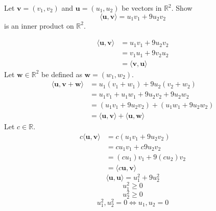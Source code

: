 \begin{exercise}
    Let \(\mathbf{v} =\left( v_1,v_2 \right) \) and \(\mathbf{u} =\left( u_1,u_2 \right) \) be vectors in \(\mathbb{R} ^2\). Show 
    \[
        \langle \mathbf{u} ,\mathbf{v}  \rangle =u_1 v_1 +9u_2 v_2
    \]
    is an inner product on \(\mathbb{R} ^2\).
    \begin{answer}
        \begin{align*}
            \langle \mathbf{u} ,\mathbf{v}  \rangle &=u_1 v_1 +9u_2 v_2\\
            &= v_1 u_1 +9v_2 u_2\\
            &=\langle \mathbf{v} ,\mathbf{u}  \rangle 
        \end{align*}
        Let \(\mathbf{w} \in\mathbb{R} ^2\) be defined as \(\mathbf{w} =\left( w_1,w_2 \right) \). 
        \begin{align*}
            \langle \mathbf{u} ,\mathbf{v} +\mathbf{w}  \rangle &=u_1 (v_{1}+w_1 )+ 9u_2 \left( v_2 +w_2 \right)\\
            &= u_1 v_1 +u_1 w_1 +9u_2 v_2 +9u_2 w_2\\
            &= \left( u_1 v_1 +9u_2 v_2 \right) + \left( u_1 w_1 +9u_2 w_2 \right) \\
            &= \langle \mathbf{u} ,\mathbf{v}  \rangle+\langle \mathbf{u} ,\mathbf{w}  \rangle  
        \end{align*}
        Let \(c\in\mathbb{R} \).
        \begin{align*}
            c\langle \mathbf{u} ,\mathbf{v}  \rangle &=c \left( u_1 v_1 +9u_2 v_2 \right) \\
            &= cu_1 v_1 +c9u_2 v_2\\
            &= \left( cu_1 \right) v_1 +9 \left( cu_2 \right) v_2\\
            &= \langle c \mathbf{u} ,\mathbf{v}  \rangle
        \end{align*}
            \[
            \langle \mathbf{u} ,\mathbf{u}  \rangle =u_1^2 +9u_2^2
            \]
            \[
                u_1^2 \geq 0
            \]
            \[
                u_2^2 \geq 0
            \]
            \[
                u_1^2,u_2^2 =0 \iff u_1,u_2 =0
            \]
        \end{answer}
\end{exercise}
